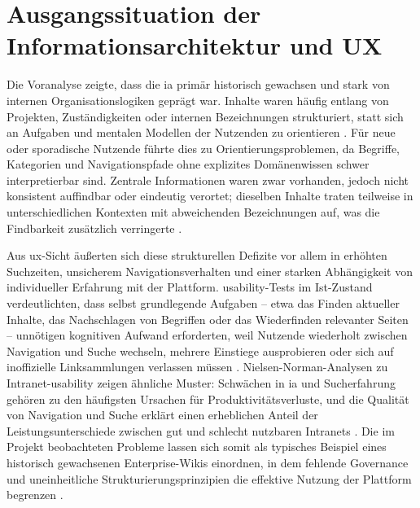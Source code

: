 \section{Ausgangssituation der Informationsarchitektur und UX}
\label{sec:03-03_ia-and-ux-current-state}

Die Voranalyse zeigte, dass die \Gls{ia} primär historisch gewachsen und stark von internen Organisationslogiken geprägt war. Inhalte waren häufig entlang von Projekten, Zuständigkeiten oder internen Bezeichnungen strukturiert, statt sich an Aufgaben und mentalen Modellen der Nutzenden zu orientieren \cite{419:Glushko2013}. Für neue oder sporadische Nutzende führte dies zu Orientierungsproblemen, da Begriffe, Kategorien und Navigationspfade ohne explizites Domänenwissen schwer interpretierbar sind. Zentrale Informationen waren zwar vorhanden, jedoch nicht konsistent auffindbar oder eindeutig verortet; dieselben Inhalte traten teilweise in unterschiedlichen Kontexten mit abweichenden Bezeichnungen auf, was die Findbarkeit zusätzlich verringerte \cite{419:Glushko2013,307:DWGFindability}.

Aus \Gls{ux}-Sicht äußerten sich diese strukturellen Defizite vor allem in erhöhten Suchzeiten, unsicherem Navigationsverhalten und einer starken Abhängigkeit von individueller Erfahrung mit der Plattform. \Gls{usability}-Tests im Ist-Zustand verdeutlichten, dass selbst grundlegende Aufgaben -- etwa das Finden aktueller Inhalte, das Nachschlagen von Begriffen oder das Wiederfinden relevanter Seiten -- unnötigen kognitiven Aufwand erforderten, weil Nutzende wiederholt zwischen Navigation und Suche wechseln, mehrere Einstiege ausprobieren oder sich auf inoffizielle Linksammlungen verlassen müssen \cite{113:NNGIntranetGuidelines}. Nielsen-Norman-Analysen zu Intranet-\Gls{usability} zeigen ähnliche Muster: Schwächen in \Gls{ia} und Sucherfahrung gehören zu den häufigsten Ursachen für Produktivitätsverluste, und die Qualität von Navigation und Suche erklärt einen erheblichen Anteil der Leistungsunterschiede zwischen gut und schlecht nutzbaren Intranets \cite{113:NNGIntranetGuidelines,111:NNGSearchVisible}. Die im Projekt beobachteten Probleme lassen sich somit als typisches Beispiel eines historisch gewachsenen Enterprise-Wikis einordnen, in dem fehlende Governance und uneinheitliche Strukturierungsprinzipien die effektive Nutzung der Plattform begrenzen \cite{307:DWGFindability}.
